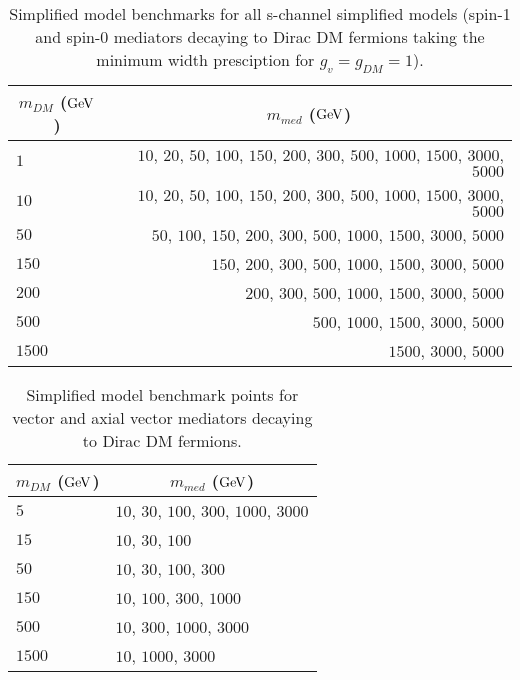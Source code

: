 \documentclass[a4,debug,notitlepage,nobib]{tufte-handout}
\begin{document}
\begin{table}[!ht]
\centering
\begin{tabular}{| l | r |}
\hline
\multicolumn{1}{|c|}{$m_{DM}$ (${\rm GeV}$)} & \multicolumn{1}{c|}{$m_{med}$ (${\rm GeV}$)} \\
\hline
 $1$    	   & $10$, $20$, $50$, $100$, $150$, $200$, $300$, $500$, $1000$, $1500$, $3000$, $5000$  \\
 $10$   	   & $10$, $20$, $50$, $100$, $150$, $200$, $300$, $500$, $1000$, $1500$, $3000$, $5000$  \\
 $50$   	   &             $50$, $100$, $150$, $200$, $300$, $500$, $1000$, $1500$, $3000$, $5000$  \\
 $150$  	   &                          $150$, $200$, $300$, $500$, $1000$, $1500$, $3000$, $5000$  \\
 $200$  	   &                                 $200$, $300$, $500$, $1000$, $1500$, $3000$, $5000$  \\
 $500$  	   &                                               $500$, $1000$, $1500$, $3000$, $5000$  \\
 $1500$ 	   &                                                              $1500$, $3000$, $5000$  \\
\hline
\end{tabular}
\caption{Simplified model benchmarks for all s-channel simplified models (spin-1 and spin-0 mediators decaying to Dirac DM fermions taking the minimum width presciption for $g_v = g_{DM} = 1$).}
\label{tab:ttdm_benchmarks}
\end{table}

\begin{table}[!ht]
\centering
\begin{tabular}{| l | l |}
\hline
\multicolumn{1}{|c|}{$m_{DM}$ (${\rm GeV}$)} & \multicolumn{1}{c|}{$m_{med}$ (${\rm GeV}$)} \\
\hline
 $5$    & $10$, $30$, $100$, $300$, $1000$, $3000$\\
 $15$   & $10$, $30$, $100$ \\
 $50$   & $10$, $30$, $100$, $300$ \\
 $150$  & $10$, \hspace{12pt} $100$, $300$, $1000$\\
 $500$  & $10$, \hspace{33pt} $300$, $1000$, $3000$  \\
 $1500$  &  $10$,\hspace{57pt} $1000$, $3000$ \\
\hline
\end{tabular}
\caption{Simplified model benchmark points for vector and axial vector mediators
decaying to Dirac DM fermions.}
\label{tab:mMedmDM_VA}
\end{table}
\end{document}
